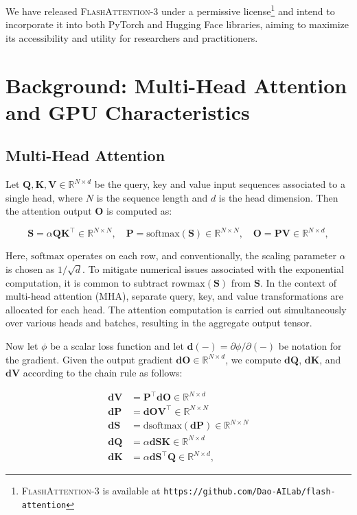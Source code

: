 \begin{enumerate}
We have released \textsc{FlashAttention-3} under a permissive license\footnote{\textsc{FlashAttention-3}
  is available at \texttt{https://github.com/Dao-AILab/flash-attention}} and intend to incorporate it into both PyTorch and Hugging Face libraries, aiming to maximize its accessibility and utility for researchers and practitioners.

\section{Background: Multi-Head Attention and GPU Characteristics}
\label{sec:background}

\subsection{Multi-Head Attention}
\label{subsec:multi_head_attn}

Let $\mathbf{Q}, \mathbf{K}, \mathbf{V} \in \mathbb{R}^{N \times d}$ be the query, key and value input sequences associated to a single head, where $N$ is the sequence length and $d$ is the head dimension. Then the attention output $\mathbf{O}$ is computed as:

\begin{equation*}
  \mathbf{S} = \alpha \mathbf{Q} \mathbf{K}^\top \in \mathbb{R}^{N \times N}, \quad \mathbf{P} = \mathrm{softmax}(\mathbf{S}) \in \mathbb{R}^{N \times N}, \quad \mathbf{O} = \mathbf{P}\mathbf{V} \in \mathbb{R}^{N \times d},
\end{equation*}

Here, $\mathrm{softmax}$ operates on each row, and conventionally, the scaling parameter $\alpha$ is chosen as $1/\sqrt{d}$. To mitigate numerical issues associated with the exponential computation, it is common to subtract $\mathrm{rowmax}(\mathbf{S})$ from $\mathbf{S}$. In the context of multi-head attention (MHA), separate query, key, and value transformations are allocated for each head. The attention computation is carried out simultaneously over various heads and batches, resulting in the aggregate output tensor.

Now let $\phi$ be a scalar loss function and let $\mathbf{d}(-) = \partial \phi / \partial (-)$ be notation for the gradient. Given the output gradient $\mathbf{dO} \in \mathbb{R}^{N \times d}$, we compute $\mathbf{dQ}$, $\mathbf{dK}$, and $\mathbf{dV}$ according to the chain rule as follows:

\begin{align*}
  \mathbf{dV} &= \mathbf{P}^\top \mathbf{dO} \in \mathbb{R}^{N \times d} \\
  \mathbf{dP} &= \mathbf{dO} \mathbf{V}^\top \in \mathbb{R}^{N \times N} \\
  \mathbf{dS} &= \mathrm{dsoftmax} (\mathbf{dP}) \in \mathbb{R}^{N \times N} \\
  \mathbf{dQ} &= \alpha \mathbf{dS} \mathbf{K} \in \mathbb{R}^{N \times d} \\
  \mathbf{dK} &= \alpha \mathbf{dS}^\top \mathbf{Q} \in \mathbb{R}^{N \times d},
\end{align*}


\end{enumerate}

